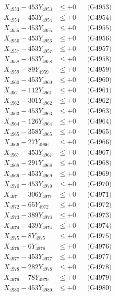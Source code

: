 \documentclass[a4paper,10pt]{article}
\begin{document}
{\begin{align}
X_{4953} - 453Y_{4953} &\leq +0 && \text{(G4953)} \\
X_{4954} - 453Y_{4954} &\leq +0 && \text{(G4954)} \\
X_{4955} - 453Y_{4955} &\leq +0 && \text{(G4955)} \\
X_{4956} - 453Y_{4956} &\leq +0 && \text{(G4956)} \\
X_{4957} - 453Y_{4957} &\leq +0 && \text{(G4957)} \\
X_{4958} - 453Y_{4958} &\leq +0 && \text{(G4958)} \\
X_{4959} - 89Y_{4959} &\leq +0 && \text{(G4959)} \\
X_{4960} - 453Y_{4960} &\leq +0 && \text{(G4960)} \\
\allowbreak
X_{4961} - 112Y_{4961} &\leq +0 && \text{(G4961)} \\
X_{4962} - 301Y_{4962} &\leq +0 && \text{(G4962)} \\
X_{4963} - 453Y_{4963} &\leq +0 && \text{(G4963)} \\
X_{4964} - 126Y_{4964} &\leq +0 && \text{(G4964)} \\
X_{4965} - 358Y_{4965} &\leq +0 && \text{(G4965)} \\
X_{4966} - 27Y_{4966} &\leq +0 && \text{(G4966)} \\
X_{4967} - 453Y_{4967} &\leq +0 && \text{(G4967)} \\
X_{4968} - 291Y_{4968} &\leq +0 && \text{(G4968)} \\
X_{4969} - 453Y_{4969} &\leq +0 && \text{(G4969)} \\
X_{4970} - 453Y_{4970} &\leq +0 && \text{(G4970)} \\
\allowbreak
X_{4971} - 306Y_{4971} &\leq +0 && \text{(G4971)} \\
X_{4972} - 65Y_{4972} &\leq +0 && \text{(G4972)} \\
X_{4973} - 389Y_{4973} &\leq +0 && \text{(G4973)} \\
X_{4974} - 439Y_{4974} &\leq +0 && \text{(G4974)} \\
X_{4975} - 8Y_{4975} &\leq +0 && \text{(G4975)} \\
X_{4976} - 6Y_{4976} &\leq +0 && \text{(G4976)} \\
X_{4977} - 453Y_{4977} &\leq +0 && \text{(G4977)} \\
X_{4978} - 282Y_{4978} &\leq +0 && \text{(G4978)} \\
X_{4979} - 78Y_{4979} &\leq +0 && \text{(G4979)} \\
X_{4980} - 453Y_{4980} &\leq +0 && \text{(G4980)} \\

\end{align}}
\end{document}
